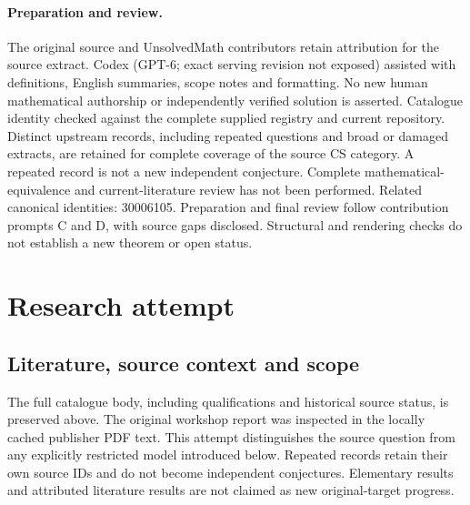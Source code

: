 \documentclass[11pt]{article}
\begin{document}
\paragraph{Preparation and review.}
The original source and UnsolvedMath contributors retain attribution for the source extract. Codex (GPT-6; exact serving revision not exposed) assisted with definitions, English summaries, scope notes and formatting. No new human mathematical authorship or independently verified solution is asserted. Catalogue identity checked against the complete supplied registry and current repository. Distinct upstream records, including repeated questions and broad or damaged extracts, are retained for complete coverage of the source CS category. A repeated record is not a new independent conjecture. Complete mathematical-equivalence and current-literature review has not been performed. Related canonical identities: 30006105. Preparation and final review follow contribution prompts C and D, with source gaps disclosed. Structural and rendering checks do not establish a new theorem or open status.
\label{end:statement}

\section{Research attempt}
\subsection{Literature, source context and scope}
The full catalogue body, including qualifications and historical source status, is preserved above. The original workshop report was inspected in the locally cached publisher PDF text. This attempt distinguishes the source question from any explicitly restricted model introduced below. Repeated records retain their own source IDs and do not become independent conjectures. Elementary results and attributed literature results are not claimed as new original-target progress.
\end{document}
